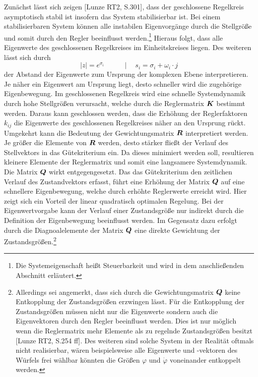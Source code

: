 Zunächst lässt sich zeigen [Lunze RT2, S.301], dass der geschlossene Regelkreis asymptotisch stabil ist insofern das System stabilisierbar ist. Bei einem stabilisierbaren System können alle instabilen Eigenvorgänge durch die Stellgröße und somit durch den Regler beeinflusst werden.\footnote{Die Systemeigenschaft heißt Steuerbarkeit und wird in dem anschließenden Abschnitt erläutert.} Hieraus folgt, dass alle Eigenwerte des geschlossenen Regelkreises im Einheitskreises liegen. Des weiteren lässt sich durch
\begin{equation}
\vert z\vert = e^{\sigma_i} \hspace{35pt} \vert \hspace{15pt} s_i = \sigma_i + \omega_i\cdot j
\end{equation}
der Abstand der Eigenwerte zum Ursprung der komplexen Ebene interpretieren. Je näher ein Eigenwert am Ursprung liegt, desto schneller wird die zugehörige Eigenbewegung. Im geschlossenen Regelkreis wird eine schnelle Systemdynamik durch hohe Stellgrößen verursacht, welche durch die Reglermatrix $\boldsymbol{K}$ bestimmt werden. Daraus kann geschlossen werden, dass die Erhöhung der Reglerfaktoren $k_{ij}$ die Eigenwerte des geschlossenen Regelkreises näher an den Ursprung rückt. Umgekehrt kann die Bedeutung der Gewichtungsmatrix $\boldsymbol{R}$ interpretiert werden. Je größer die Elemente von $\boldsymbol{R}$ werden, desto stärker fließt der Verlauf des Stellvektors in das Gütekriterium ein. Da dieses minimiert werden soll, resultieren kleinere Elemente der Reglermatrix und somit eine langsamere Systemdynamik.
Die Matrix $\boldsymbol{Q}$ wirkt entgegengesetzt. Das das Gütekriterium den zeitlichen Verlauf des Zustandvektors erfasst, führt eine Erhöhung der Matrix $\boldsymbol{Q}$ auf eine schnellere Eigenbewegung, welche durch erhöhte Reglerwerte erreicht wird. Hier zeigt sich ein Vorteil der linear quadratisch optimalen Regelung. Bei der Eigenwertvorgabe kann der Verlauf einer Zustandsgröße nur indirekt durch die Definition der Eigenbewegung beeinflusst werden. Im Gegensatz dazu erfolgt durch die Diagnoalelemente der Matrix $\boldsymbol{Q}$ eine direkte Gewichtung der Zustandsgrößen.\footnote{Allerdings sei angemerkt, dass sich durch die Gewichtungsmatrix $\boldsymbol{Q}$ keine Entkopplung der Zustandsgrößen erzwingen lässt. Für die Entkopplung der Zustandsgrößen müssen nicht nur die Eigenwerte sondern auch die Eigenvektoren durch den Regler beeinflusst werden. Dies ist nur möglich wenn die Reglermatrix mehr Elemente als zu regelnde Zustandsgrößen besitzt [Lunze RT2, S.254 ff]. Des weiteren sind solche System in der Realität oftmals nicht realisierbar, wären beispielsweise alle Eigenwerte und -vektoren des Würfels frei wählbar könnten die Größen $\varphi$ und $\dot{\varphi}$ voneinander entkoppelt werden.}
